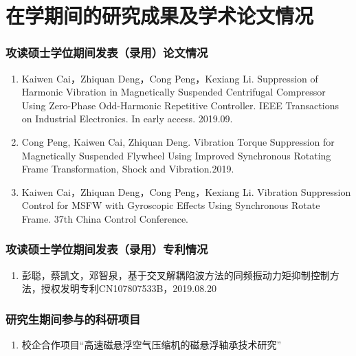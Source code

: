 \chapter{在学期间的研究成果及学术论文情况}


\subsection*{攻读硕士学位期间发表（录用）论文情况}

\begin{enumerate}
  \item Kaiwen Cai，Zhiquan Deng，Cong Peng，Kexiang Li. Suppression of Harmonic Vibration in Magnetically Suspended Centrifugal Compressor Using Zero-Phase Odd-Harmonic Repetitive Controller. IEEE Transactions on Industrial Electronics. In early access. 2019.09.
  \item Cong Peng, Kaiwen Cai, Zhiquan Deng. Vibration Torque Suppression for Magnetically Suspended Flywheel Using Improved Synchronous Rotating Frame Transformation, Shock and Vibration.2019.
  \item Kaiwen Cai，Zhiquan Deng，Cong Peng，Kexiang Li. Vibration Suppression Control for MSFW with Gyroscopic Effects Using Synchronous Rotate Frame. 37th China Control Conference.
\end{enumerate}

\subsection*{攻读硕士学位期间发表（录用）专利情况}

\begin{enumerate}
  \item 彭聪，蔡凯文，邓智泉，基于交叉解耦陷波方法的同频振动力矩抑制控制方法，授权发明专利CN107807533B，2019.08.20
\end{enumerate}

\subsection*{研究生期间参与的科研项目}

\begin{enumerate}
  \item 校企合作项目“高速磁悬浮空气压缩机的磁悬浮轴承技术研究”
\end{enumerate}
